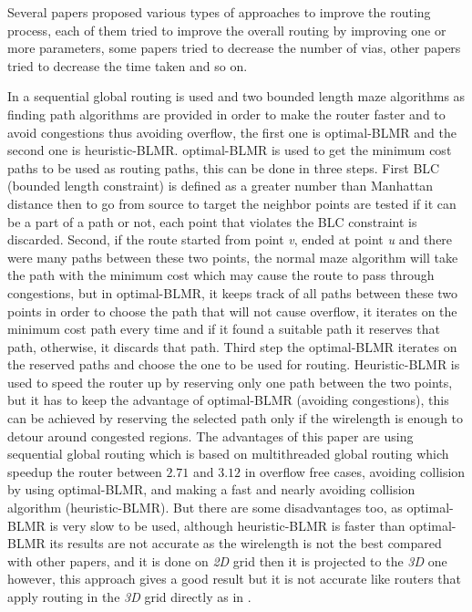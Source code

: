 \documentclass[conference]{IEEEtran}
\begin{document}
Several papers proposed various types of approaches to improve the routing process, each of them tried to improve the overall routing by improving one or more parameters, some papers tried to decrease the number of vias, other papers tried to decrease the time taken and so on.
\par
In \cite{b1} a sequential global routing is used and two bounded length maze algorithms as finding path algorithms are provided in order to make the router faster and to avoid congestions thus avoiding overflow, the first one is optimal-BLMR and the second one is heuristic-BLMR. optimal-BLMR is used to get the minimum cost paths to be used as routing paths, this can be done in three steps. First BLC (bounded length constraint) is defined as a greater number than Manhattan distance then to go from source to target the neighbor points are tested if it can be a part of a path or not, each point that violates the BLC constraint is discarded. Second, if the route started from point \textit{v}, ended at point \textit{u} and there were many paths between these two points, the normal maze algorithm will take the path with the minimum cost which may cause the route to pass through congestions, but in optimal-BLMR, it keeps track of all paths between these two points in order to choose the path that will not cause overflow, it iterates on the minimum cost path every time and if it found a suitable path it reserves that path, otherwise, it discards that path. Third step the optimal-BLMR iterates on the reserved paths and choose the one to be used for routing. Heuristic-BLMR is used to speed the router up by reserving only one path between the two points, but it has to keep the advantage of optimal-BLMR (avoiding congestions), this can be achieved by reserving the selected path only if the wirelength is enough to detour around congested regions. The advantages of this paper are using sequential global routing which is based on multithreaded global routing which speedup the router between $2.71$ and $3.12$ in overflow free cases, avoiding collision by using optimal-BLMR, and making a fast and nearly avoiding collision algorithm (heuristic-BLMR). But there are some disadvantages too, as optimal-BLMR is very slow to be used, although heuristic-BLMR is faster than optimal-BLMR its results are not accurate as the wirelength is not the best compared with other papers, and it is done on \textit{2D} grid then it is projected to the \textit{3D} one however, this approach gives a good result but it is not accurate like routers that apply routing in the \textit{3D} grid directly as in \cite{b9}.
\end{document}
